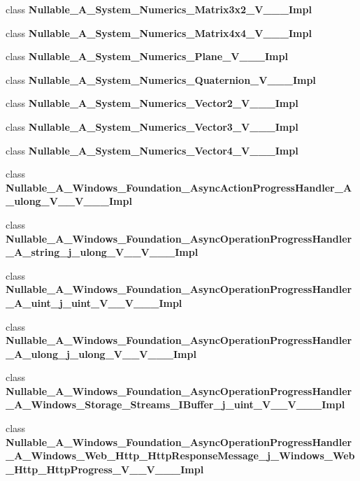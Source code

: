 \begin{DoxyCompactItemize}
class {\bfseries Nullable\+\_\+\+A\+\_\+\+System\+\_\+\+Numerics\+\_\+\+Matrix3x2\+\_\+\+V\+\_\+\+\_\+\+\_\+\+Impl}
\item 
class {\bfseries Nullable\+\_\+\+A\+\_\+\+System\+\_\+\+Numerics\+\_\+\+Matrix4x4\+\_\+\+V\+\_\+\+\_\+\+\_\+\+Impl}
\item 
class {\bfseries Nullable\+\_\+\+A\+\_\+\+System\+\_\+\+Numerics\+\_\+\+Plane\+\_\+\+V\+\_\+\+\_\+\+\_\+\+Impl}
\item 
class {\bfseries Nullable\+\_\+\+A\+\_\+\+System\+\_\+\+Numerics\+\_\+\+Quaternion\+\_\+\+V\+\_\+\+\_\+\+\_\+\+Impl}
\item 
class {\bfseries Nullable\+\_\+\+A\+\_\+\+System\+\_\+\+Numerics\+\_\+\+Vector2\+\_\+\+V\+\_\+\+\_\+\+\_\+\+Impl}
\item 
class {\bfseries Nullable\+\_\+\+A\+\_\+\+System\+\_\+\+Numerics\+\_\+\+Vector3\+\_\+\+V\+\_\+\+\_\+\+\_\+\+Impl}
\item 
class {\bfseries Nullable\+\_\+\+A\+\_\+\+System\+\_\+\+Numerics\+\_\+\+Vector4\+\_\+\+V\+\_\+\+\_\+\+\_\+\+Impl}
\item 
class {\bfseries Nullable\+\_\+\+A\+\_\+\+Windows\+\_\+\+Foundation\+\_\+\+Async\+Action\+Progress\+Handler\+\_\+\+A\+\_\+ulong\+\_\+\+V\+\_\+\+\_\+\+V\+\_\+\+\_\+\+\_\+\+Impl}
\item 
class {\bfseries Nullable\+\_\+\+A\+\_\+\+Windows\+\_\+\+Foundation\+\_\+\+Async\+Operation\+Progress\+Handler\+\_\+\+A\+\_\+string\+\_\+j\+\_\+ulong\+\_\+\+V\+\_\+\+\_\+\+V\+\_\+\+\_\+\+\_\+\+Impl}
\item 
class {\bfseries Nullable\+\_\+\+A\+\_\+\+Windows\+\_\+\+Foundation\+\_\+\+Async\+Operation\+Progress\+Handler\+\_\+\+A\+\_\+uint\+\_\+j\+\_\+uint\+\_\+\+V\+\_\+\+\_\+\+V\+\_\+\+\_\+\+\_\+\+Impl}
\item 
class {\bfseries Nullable\+\_\+\+A\+\_\+\+Windows\+\_\+\+Foundation\+\_\+\+Async\+Operation\+Progress\+Handler\+\_\+\+A\+\_\+ulong\+\_\+j\+\_\+ulong\+\_\+\+V\+\_\+\+\_\+\+V\+\_\+\+\_\+\+\_\+\+Impl}
\item 
class {\bfseries Nullable\+\_\+\+A\+\_\+\+Windows\+\_\+\+Foundation\+\_\+\+Async\+Operation\+Progress\+Handler\+\_\+\+A\+\_\+\+Windows\+\_\+\+Storage\+\_\+\+Streams\+\_\+\+I\+Buffer\+\_\+j\+\_\+uint\+\_\+\+V\+\_\+\+\_\+\+V\+\_\+\+\_\+\+\_\+\+Impl}
\item 
class {\bfseries Nullable\+\_\+\+A\+\_\+\+Windows\+\_\+\+Foundation\+\_\+\+Async\+Operation\+Progress\+Handler\+\_\+\+A\+\_\+\+Windows\+\_\+\+Web\+\_\+\+Http\+\_\+\+Http\+Response\+Message\+\_\+j\+\_\+\+Windows\+\_\+\+Web\+\_\+\+Http\+\_\+\+Http\+Progress\+\_\+\+V\+\_\+\+\_\+\+V\+\_\+\+\_\+\+\_\+\+Impl}

\end{DoxyCompactItemize}
